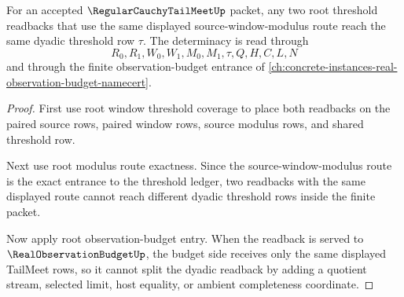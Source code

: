 \begin{theorem}
\label{thm:regular-cauchy-tail-meet-root-threshold-readback-determinacy}
For an accepted $\RegularCauchyTailMeetUp$ packet, any two root threshold readbacks that use the same displayed source-window-modulus route reach the same dyadic threshold row $\tau$. The determinacy is read through
$$
R_0,R_1,W_0,W_1,M_0,M_1,\tau,Q,H,C,L,N
$$
and through the finite observation-budget entrance of \autoref{ch:concrete-instances-real-observation-budget-namecert}.
\end{theorem}
\begin{proof}
First use root window threshold coverage to place both readbacks on the paired source rows, paired window rows, source modulus rows, and shared threshold row.

Next use root modulus route exactness. Since the source-window-modulus route is the exact entrance to the threshold ledger, two readbacks with the same displayed route cannot reach different dyadic threshold rows inside the finite packet.

Now apply root observation-budget entry. When the readback is served to $\RealObservationBudgetUp$, the budget side receives only the same displayed TailMeet rows, so it cannot split the dyadic readback by adding a quotient stream, selected limit, host equality, or ambient completeness coordinate.
\end{proof}

